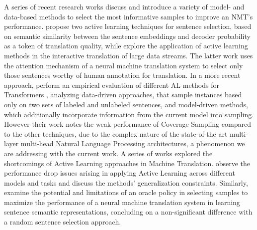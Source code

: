
A series of recent research works discuss and introduce a variety of model- and data-based methods to select the most informative samples to improve an NMT's performance.
\citet{zhang2018active} propose two active learning techniques for sentence selection, based on semantic similarity between the sentence embeddings and decoder probability as a token of translation quality, while \citet{peris2020active} explore the application of active learning methods in the interactive translation of large data streams. The latter work uses the attention mechanism of a neural machine translation system to select only those sentences worthy of human annotation for translation. 
In a more recent approach, \citet{zeng2019empirical} perform an empirical evaluation of different AL methods for Transformers \cite{vaswani2017attention}, analyzing data-driven approaches, that sample instances based only on two sets of labeled and unlabeled sentences, and model-driven methods, which additionally incorporate information from the current model into sampling. 
However their work notes the weak performance of Coverage Sampling compared to the other techniques, due to the complex nature of the state-of-the art multi-layer multi-head Natural Language Processing architectures, a phenomenon we are addressing with the current work.
A series of works explored the shortcomings of Active Learning approaches in Machine Translation. \cite{lowell2018practical} observe the performance drop issues arising in applying Active Learning across different models and tasks and discuss the methods' generalization constraints. Similarly, \citet{koshorek2019limits} examine the potential and limitations of an oracle policy in selecting samples to maximize the performance of a neural machine translation system in learning sentence semantic representations, concluding on a non-significant difference with a random sentence selection approach.
